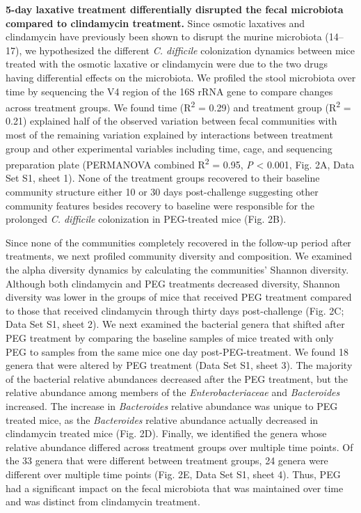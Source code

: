 \documentclass[
  11pt,
]{article}
\begin{document}
\textbf{5-day laxative treatment differentially disrupted the fecal
microbiota compared to clindamycin treatment.} Since osmotic laxatives
and clindamycin have previously been shown to disrupt the murine
microbiota (14--17), we hypothesized the different \emph{C. difficile}
colonization dynamics between mice treated with the osmotic laxative or
clindamycin were due to the two drugs having differential effects on the
microbiota. We profiled the stool microbiota over time by sequencing the
V4 region of the 16S rRNA gene to compare changes across treatment
groups. We found time (R\textsuperscript{2} = 0.29) and treatment group
(R\textsuperscript{2} = 0.21) explained half of the observed variation
between fecal communities with most of the remaining variation explained
by interactions between treatment group and other experimental variables
including time, cage, and sequencing preparation plate (PERMANOVA
combined R\textsuperscript{2} = 0.95, \emph{P} \textless{} 0.001, Fig.
2A, Data Set S1, sheet 1). None of the treatment groups recovered to
their baseline community structure either 10 or 30 days post-challenge
suggesting other community features besides recovery to baseline were
responsible for the prolonged \emph{C. difficile} colonization in
PEG-treated mice (Fig. 2B).

Since none of the communities completely recovered in the follow-up
period after treatments, we next profiled community diversity and
composition. We examined the alpha diversity dynamics by calculating the
communities' Shannon diversity. Although both clindamycin and PEG
treatments decreased diversity, Shannon diversity was lower in the
groups of mice that received PEG treatment compared to those that
received clindamycin through thirty days post-challenge (Fig. 2C; Data
Set S1, sheet 2). We next examined the bacterial genera that shifted
after PEG treatment by comparing the baseline samples of mice treated
with only PEG to samples from the same mice one day post-PEG-treatment.
We found 18 genera that were altered by PEG treatment (Data Set S1,
sheet 3). The majority of the bacterial relative abundances decreased
after the PEG treatment, but the relative abundance among members of the
\emph{Enterobacteriaceae} and \emph{Bacteroides} increased. The increase
in \emph{Bacteroides} relative abundance was unique to PEG treated mice,
as the \emph{Bacteroides} relative abundance actually decreased in
clindamycin treated mice (Fig. 2D). Finally, we identified the genera
whose relative abundance differed across treatment groups over multiple
time points. Of the 33 genera that were different between treatment
groups, 24 genera were different over multiple time points (Fig. 2E,
Data Set S1, sheet 4). Thus, PEG had a significant impact on the fecal
microbiota that was maintained over time and was distinct from
clindamycin treatment.
\end{document}
